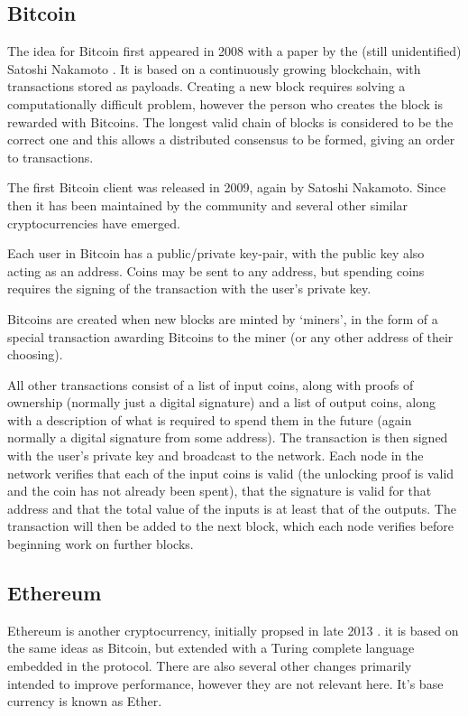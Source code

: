 \documentclass[12pt,a4paper,twoside,openright]{report}
\begin{document}
\subsection{Bitcoin}

The idea for Bitcoin first appeared in 2008 with a paper by the (still unidentified) Satoshi Nakamoto \cite{bitcoin-whitepaper}.
It is based on a continuously growing blockchain, with transactions stored as payloads.
Creating a new block requires solving a computationally difficult problem, however the person who creates the block is rewarded with Bitcoins.
The longest valid chain of blocks is considered to be the correct one and this allows a distributed consensus to be formed,
giving an order to transactions.

The first Bitcoin client was released in 2009, again by Satoshi Nakamoto.
Since then it has been maintained by the community and several other similar cryptocurrencies have emerged.


Each user in Bitcoin has a public/private key-pair, with the public key also acting as an address.
Coins may be sent to any address, but spending coins requires the signing of the transaction with the user's private key.

Bitcoins are created when new blocks are minted by `miners',
in the form of a special transaction awarding Bitcoins to the miner (or any other address of their choosing).

All other transactions consist of a list of input coins, along with proofs of ownership (normally just a digital signature)
and a list of output coins, along with a description of what is required to spend them in the future (again normally a digital signature from some address).
The transaction is then signed with the user's private key and broadcast to the network.
Each node in the network verifies that each of the input coins is valid (the unlocking proof is valid
and the coin has not already been spent), that the signature is valid for that address and that the total value of the inputs is at least that of the outputs.
The transaction will then be added to the next block, which each node verifies before beginning work on further blocks.


\subsection{Ethereum}


Ethereum is another cryptocurrency, initially propsed in late 2013 \cite{eth-whitepaper}.
it is based on the same ideas as Bitcoin, but extended with a Turing complete language
embedded in the protocol.
There are also several other changes primarily intended to improve performance, however they are not relevant here.
It's base currency is known as Ether.
\end{document}
